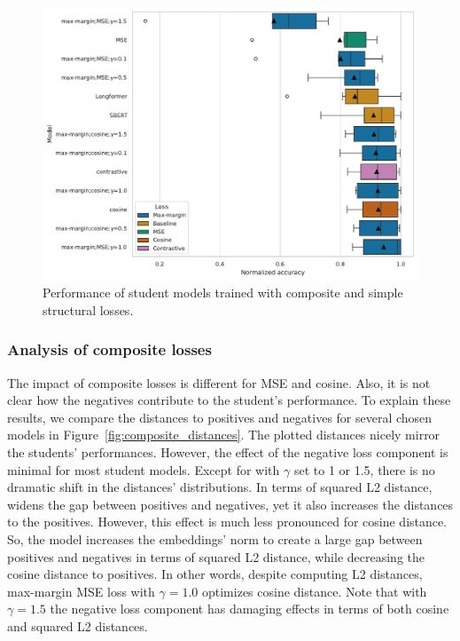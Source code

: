 \begin{figure}

  \includegraphics[width=\textwidth]{./img/structural_both_losses.pdf}

  \caption{Performance of student models trained with composite and simple
  structural losses.}

  \label{fig:structural_composite_vs_simple}
\end{figure}

\subsubsection{Analysis of composite losses}\label{section:composite_analysis}

The impact of composite losses is different for MSE and cosine. Also, it is not
clear how the negatives contribute to the student's performance. To explain
these results, we compare the distances to positives and negatives for several
chosen models in Figure~\ref{fig:composite_distances}. The plotted distances
nicely mirror the students' performances. However, the effect of the negative
loss component is minimal for most student models. Except for
 with $\gamma$ set to 1 or 1.5, there is no dramatic
shift in the distances' distributions. In terms of squared L2 distance,
 widens the gap between positives and
negatives, yet it also increases the distances to the positives. However, this
effect is much less pronounced for cosine distance. So, the model increases the
embeddings' norm to create a large gap between positives and negatives in terms
of squared L2 distance, while decreasing the cosine distance to positives. In
other words, despite computing L2 distances, max-margin MSE loss with
$\gamma=1.0$ optimizes cosine distance. Note that with $\gamma=1.5$ the
negative loss component has damaging effects in terms of both cosine and
squared L2 distances.

